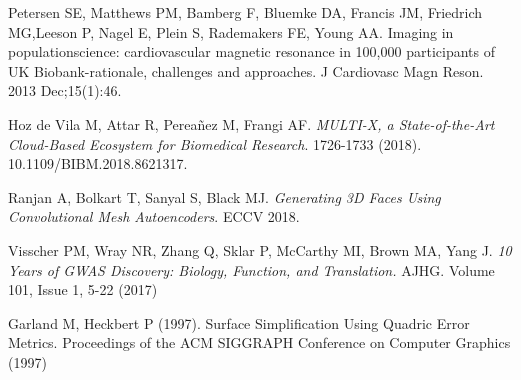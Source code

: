 \documentclass[twocolumn]{llncs}
\begin{document}
\begin{thebibliography}{8}
Petersen SE, Matthews PM, Bamberg F, Bluemke DA, Francis JM, Friedrich MG,Leeson  P,  Nagel  E,  Plein  S,  Rademakers  FE,  Young  AA.  Imaging  in  populationscience: cardiovascular magnetic resonance in 100,000 participants of UK Biobank-rationale, challenges and approaches. J Cardiovasc Magn Reson. 2013 Dec;15(1):46.


Hoz de Vila M, Attar R, Perea\~nez M, Frangi AF. \textit{MULTI-X, a State-of-the-Art Cloud-Based Ecosystem for Biomedical Research}. 1726-1733 (2018). 10.1109/BIBM.2018.8621317.

Ranjan A, Bolkart T, Sanyal S, Black MJ. \textit{Generating 3D Faces Using Convolutional Mesh Autoencoders}. ECCV 2018.

Visscher PM, Wray NR, Zhang Q, Sklar P, McCarthy MI, Brown MA, Yang J. \textit{10 Years of GWAS Discovery: Biology, Function, and Translation.} AJHG. Volume 101, Issue 1, 5-22 (2017)

Garland M, Heckbert P (1997). Surface Simplification Using Quadric Error Metrics. Proceedings of the ACM SIGGRAPH Conference on Computer Graphics (1997)

\end{thebibliography}
\end{document}
